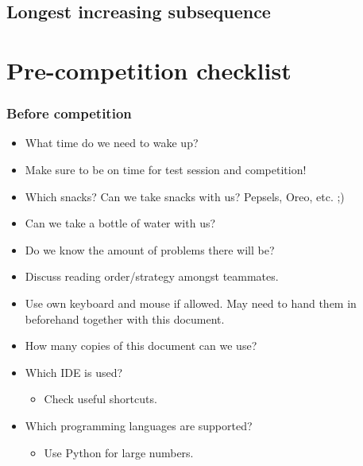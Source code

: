 \subsection{Longest increasing subsequence}






\section{Pre-competition checklist}

\subsubsection{Before competition}
\begin{itemize}
    \item What time do we need to wake up?
    \item Make sure to be on time for test session and competition!
    \item Which snacks? Can we take snacks with us? Pepsels, Oreo, etc. ;)
    \item Can we take a bottle of water with us?
    \item Do we know the amount of problems there will be?
    \item Discuss reading order/strategy amongst teammates.
    \item Use own keyboard and mouse if allowed. May need to hand them in beforehand together with this document.
    \item How many copies of this document can we use?
    \item Which IDE is used?
    \begin{itemize}
        \item Check useful shortcuts.
    \end{itemize}
    \item Which programming languages are supported?
    \begin{itemize}
        \item Use Python for large numbers.
    \end{itemize}
\end{itemize}

